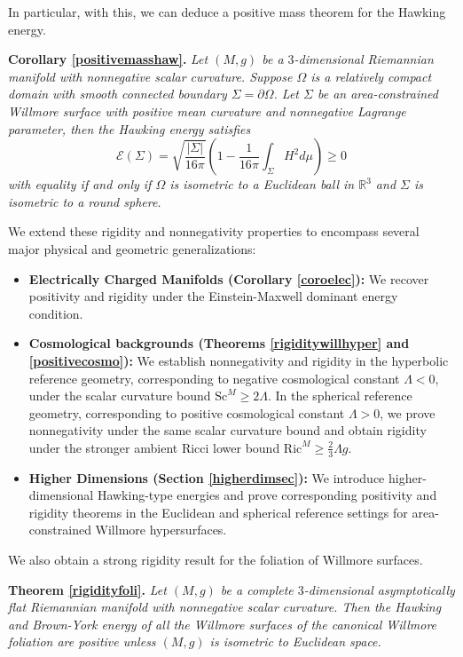 \documentclass[12pt,a4paper]{amsart}
\theoremstyle{plain}
\theoremstyle{definition}
\begin{document}
  In particular, with this, we can deduce a positive mass theorem for the Hawking energy.

  
  \noindent\textbf{Corollary \ref{positivemasshaw}.} \emph{Let $(M,g)$ be a $3$-dimensional Riemannian  manifold with nonnegative scalar curvature. Suppose $\Omega$ is a relatively compact domain with smooth connected boundary  $\Sigma=  \partial \Omega $.  Let $\Sigma $ be an  area-constrained Willmore surface with positive mean curvature and nonnegative Lagrange parameter, then the Hawking energy satisfies
  $$  \mathcal{E}(\Sigma) = \sqrt{\frac{|\Sigma|}{16 \pi}} \left( 1- \frac{1}{16 \pi} \int_\Sigma H^2  d\mu \right) \geq 0 $$
  with equality if and only if $\Omega$ is isometric to a Euclidean ball in $\mathbb{R}^3$ and $\Sigma$ is isometric to a round sphere. }



 We extend these rigidity and nonnegativity properties to encompass several major physical and geometric generalizations:
\begin{itemize}
    \item \textbf{Electrically Charged Manifolds (Corollary \ref{coroelec}):} We recover positivity and rigidity under the Einstein-Maxwell dominant energy condition.
     \item \textbf{Cosmological backgrounds (Theorems \ref{rigiditywillhyper} and \ref{positivecosmo}):} We establish nonnegativity and rigidity in the hyperbolic reference geometry, corresponding to negative cosmological constant $\Lambda<0$, under the scalar curvature bound $\mathrm{Sc}^M\ge 2\Lambda$. In the spherical reference geometry, corresponding to positive cosmological constant $\Lambda>0$, we prove nonnegativity under the same scalar curvature bound and obtain rigidity under the stronger ambient Ricci lower bound $\mathrm{Ric}^M\ge \frac{2}{3}\Lambda g$.



    \item \textbf{Higher Dimensions (Section \ref{higherdimsec}):} We introduce higher-dimensional Hawking-type energies and prove corresponding positivity and rigidity theorems in the Euclidean and spherical reference settings for area-constrained Willmore hypersurfaces.
\end{itemize}
 We also obtain a strong rigidity result for the foliation of Willmore surfaces. 

\noindent\textbf{Theorem \ref{rigidityfoli}.} \emph{Let $(M, g)$ be a complete $3$-dimensional asymptotically flat  Riemannian manifold with nonnegative scalar curvature. Then the Hawking and  Brown-York energy of all the Willmore surfaces of the canonical Willmore foliation are positive unless $(M,g)$ is isometric to Euclidean space.}
\end{document}
